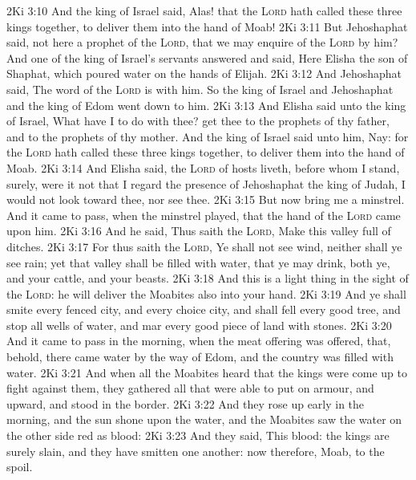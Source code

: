 \vs 2Ki 3:10 And the king of Israel said, Alas! that the \textsc{Lord} hath called these three kings together, to deliver them into the hand of Moab!
\vs 2Ki 3:11 But Jehoshaphat said,  not here a prophet of the \textsc{Lord}, that we may enquire of the \textsc{Lord} by him? And one of the king of Israel's servants answered and said, Here  Elisha the son of Shaphat, which poured water on the hands of Elijah.
\vs 2Ki 3:12 And Jehoshaphat said, The word of the \textsc{Lord} is with him. So the king of Israel and Jehoshaphat and the king of Edom went down to him.
\vs 2Ki 3:13 And Elisha said unto the king of Israel, What have I to do with thee? get thee to the prophets of thy father, and to the prophets of thy mother. And the king of Israel said unto him, Nay: for the \textsc{Lord} hath called these three kings together, to deliver them into the hand of Moab.
\vs 2Ki 3:14 And Elisha said,  the \textsc{Lord} of hosts liveth, before whom I stand, surely, were it not that I regard the presence of Jehoshaphat the king of Judah, I would not look toward thee, nor see thee.
\vs 2Ki 3:15 But now bring me a minstrel. And it came to pass, when the minstrel played, that the hand of the \textsc{Lord} came upon him.
\vs 2Ki 3:16 And he said, Thus saith the \textsc{Lord}, Make this valley full of ditches.
\vs 2Ki 3:17 For thus saith the \textsc{Lord}, Ye shall not see wind, neither shall ye see rain; yet that valley shall be filled with water, that ye may drink, both ye, and your cattle, and your beasts.
\vs 2Ki 3:18 And this is  a light thing in the sight of the \textsc{Lord}: he will deliver the Moabites also into your hand.
\vs 2Ki 3:19 And ye shall smite every fenced city, and every choice city, and shall fell every good tree, and stop all wells of water, and mar every good piece of land with stones.
\vs 2Ki 3:20 And it came to pass in the morning, when the meat offering was offered, that, behold, there came water by the way of Edom, and the country was filled with water.
\vs 2Ki 3:21 And when all the Moabites heard that the kings were come up to fight against them, they gathered all that were able to put on armour, and upward, and stood in the border.
\vs 2Ki 3:22 And they rose up early in the morning, and the sun shone upon the water, and the Moabites saw the water on the other side  red as blood:
\vs 2Ki 3:23 And they said, This  blood: the kings are surely slain, and they have smitten one another: now therefore, Moab, to the spoil.
